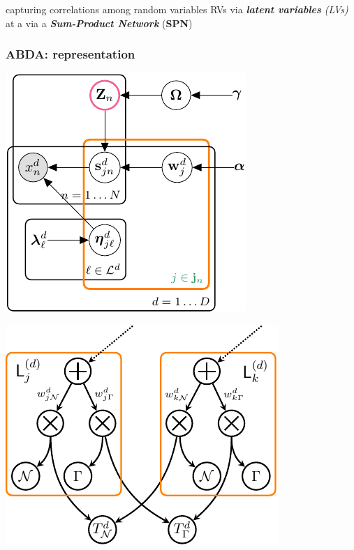 \documentclass[xcolor={usenames,dvipsnames,svgnames}, compress, aspectratio=169, 11pt]{beamer}
\begin{document}
\begin{frame}[t, htt=bgrey2]
\begin{minipage}[t]{0.3\linewidth}
  \end{minipage}\hfill\begin{minipage}[t]{0.4\linewidth}
    \vspace{-150pt}
      capturing  correlations among random variables RVs via
  \emph{\textbf{latent variables} (LVs)} at
  a  via a \emph{\textbf{Sum-Product
    Network}} (\textbf{SPN})~\cite{Poon2011} 
  \end{minipage}  
\end{frame}

\begin{frame}[t, htt=bgrey2]
  \frametitle{ABDA: representation}

  \large
  \begin{minipage}[t]{0.3\linewidth}
    \includegraphics[width=.99\linewidth]{figures/joint-param-hspn-crop}
  \end{minipage}\hfill\begin{minipage}[t]{0.3\linewidth}
    \includegraphics[width=.99\linewidth]{figures/type-leaf-crop}

\end{minipage}
\end{frame}
\end{document}
